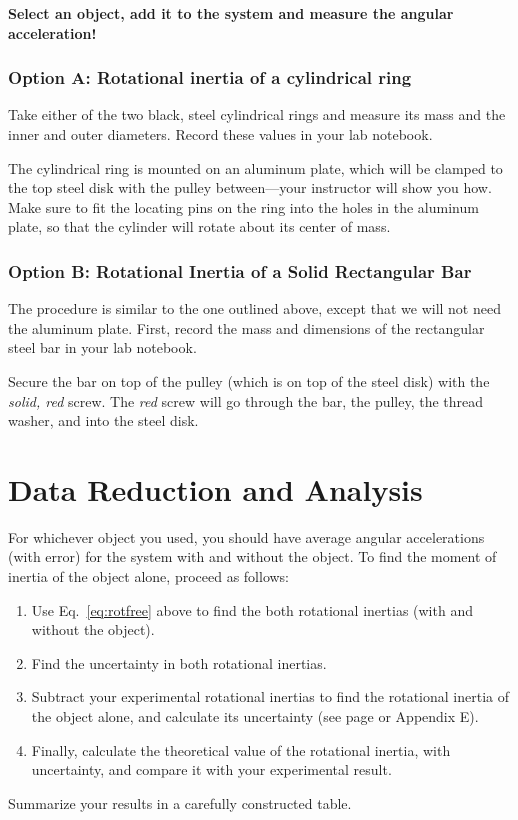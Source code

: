 {\bf Select an object, add it to the system and measure the angular acceleration!}

\subsubsection*{Option A:  Rotational inertia of a cylindrical ring}
Take either of
the two black, steel cylindrical rings and measure its mass and the
inner and outer diameters. Record these values in your
lab notebook.

The cylindrical ring is mounted on an aluminum plate, which will be
clamped to the top steel disk with the pulley between---your instructor will show you how.
Make sure to fit the locating pins on the ring into the holes
in the aluminum plate, so that the cylinder will rotate about its
center of mass.

\subsubsection*{Option B: Rotational Inertia of a Solid Rectangular
Bar} The procedure is similar to the one outlined above, except that
we will not need the aluminum plate.  First, record the
mass and dimensions of the rectangular steel bar in your lab notebook.

Secure the bar on top of the pulley (which is on top of the steel disk)
with the {\em solid, red}
screw.  The {\em red} screw will go through the bar, the pulley, the
thread
washer, and into the steel disk.

\section*{Data Reduction and Analysis}

For whichever object you used, you should have average angular
accelerations (with error) for the system with
and without the object.  To find the moment of inertia of the object
alone, proceed as follows:

\begin{enumerate}
%
%
\item Use Eq.~\ref{eq:rotfree} above to find the both rotational
inertias (with and without the object).
%
\item Find the uncertainty in both rotational inertias.
%
\item Subtract your experimental rotational inertias to find the rotational inertia of the object alone,
and calculate its uncertainty (see page \pageref{table1} or Appendix E).
%
\item Finally, calculate the theoretical value of the rotational
inertia, with uncertainty, and compare it with your experimental
result.
\end{enumerate}
Summarize your results in a carefully constructed table.

